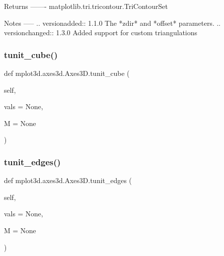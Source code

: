 \begin{DoxyVerb}
\begin{DoxyVerb}
Returns
-------
matplotlib.tri.tricontour.TriContourSet

Notes
-----
.. versionadded:: 1.1.0
    The *zdir* and *offset* parameters.
.. versionchanged:: 1.3.0
    Added support for custom triangulations
\end{DoxyVerb}
 \mbox{\label{classmplot3d_1_1axes3d_1_1Axes3D_a6fc1d3eca7a87762c96241f7694eb364}} 
\subsubsection{\texorpdfstring{tunit\+\_\+cube()}{tunit\_cube()}}
{\footnotesize\ttfamily def mplot3d.\+axes3d.\+Axes3\+D.\+tunit\+\_\+cube (\begin{DoxyParamCaption}\item[{}]{self,  }\item[{}]{vals = {\ttfamily None},  }\item[{}]{M = {\ttfamily None} }\end{DoxyParamCaption})}

\mbox{\label{classmplot3d_1_1axes3d_1_1Axes3D_a1497786d5b20b9f8dc0f7afef5e80118}} 
\subsubsection{\texorpdfstring{tunit\+\_\+edges()}{tunit\_edges()}}
{\footnotesize\ttfamily def mplot3d.\+axes3d.\+Axes3\+D.\+tunit\+\_\+edges (\begin{DoxyParamCaption}\item[{}]{self,  }\item[{}]{vals = {\ttfamily None},  }\item[{}]{M = {\ttfamily None} }\end{DoxyParamCaption})}

\mbox{\label{classmplot3d_1_1axes3d_1_1Axes3D_a793483aca5f85ad38c70f7475d9ccd57}} 

\end{DoxyVerb}
